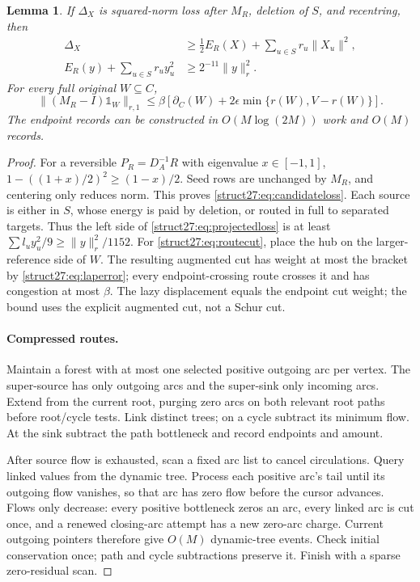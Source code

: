 \documentclass[11pt]{article}
\newtheorem{lemma}[theorem]{Lemma}
\theoremstyle{remark}
\newcommand{\norm}[1]{\lVert#1\rVert}
\newcommand{\oone}{\mathds{1}}
\begin{document}
\begin{lemma}\label{struct27:lem:candidate}
If $\Delta_X$ is squared-norm loss after $M_R$, deletion of $S$, and recentring,
then
\begin{align}
 \Delta_X&\ge\tfrac12 E_R(X)+\sum_{u\in S}r_u\norm{X_u}^2,\label{struct27:eq:candidateloss}\\
 E_R(y)+\sum_{u\in S}r_uy_u^2&\ge2^{-11}\norm{y}_r^2.\label{struct27:eq:projectedloss}
\end{align}
For every full original $W\subseteq C$,
\begin{equation}\label{struct27:eq:routecut}
 \norm{(M_R-I)\oone_W}_{r,1}
 \le\beta[\partial_C(W)+2\epsilon\min\{r(W),V-r(W)\}].
\end{equation}
The endpoint records can be constructed in $O(M\log(2M))$ work and $O(M)$
records.
\end{lemma} \begin{proof} For a reversible $P_R=D_A^{-1}R$ with eigenvalue
$x\in[-1,1]$, $1-((1+x)/2)^2\ge(1-x)/2$.
Seed rows are unchanged by $M_R$, and centering only reduces norm.
This proves \eqref{struct27:eq:candidateloss}.
Each source is either in $S$, whose energy is paid by deletion, or routed in
full to separated targets.
Thus the left side of \eqref{struct27:eq:projectedloss} is at least $\sum
l_uy_u^2/9\ge\norm{y}_r^2/1152$.
For \eqref{struct27:eq:routecut}, place the hub on the larger-reference side of
$W$.
The resulting augmented cut has weight at most the bracket by
\eqref{struct27:eq:laperror}; every endpoint-crossing route crosses it and has
congestion at most $\beta$.
The lazy displacement equals the endpoint cut weight; the bound uses the
explicit augmented cut, not a Schur cut.

\paragraph{Compressed routes.}
Maintain a forest with at most one selected positive outgoing arc per vertex.
The super-source has only outgoing arcs and the super-sink only incoming arcs.
Extend from the current root, purging zero arcs on both relevant root paths
before root/cycle tests.
Link distinct trees; on a cycle subtract its minimum flow.
At the sink subtract the path bottleneck and record endpoints and amount.

After source flow is exhausted, scan a fixed arc list to cancel circulations.
Query linked values from the dynamic tree.
Process each positive arc's tail until its outgoing flow vanishes, so that arc
has zero flow before the cursor advances.
Flows only decrease: every positive bottleneck zeros an arc, every linked arc is
cut once, and a renewed closing-arc attempt has a new zero-arc charge.
Current outgoing pointers therefore give $O(M)$ dynamic-tree events.
Check initial conservation once; path and cycle subtractions preserve it.
Finish with a sparse zero-residual scan.


\end{proof}
\end{document}
